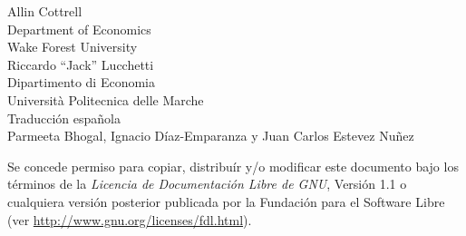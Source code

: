\documentclass[oneside,spanish]{book}
\begin{document}
\VerbatimFootnotes

\setlength{\parindent}{0pt}
\setlength{\parskip}{1ex}



\thispagestyle{empty}

\begin{center}



{\large \sffamily
Allin Cottrell\\
Department of Economics\\
Wake Forest University\\

\vspace{20pt}
Riccardo ``Jack'' Lucchetti\\
Dipartimento di Economia\\
Università Politecnica delle Marche\\

\vspace{20pt}
Traducción española \\
Parmeeta Bhogal, Ignacio Díaz-Emparanza y Juan Carlos Estevez Nuñez

\vspace{20pt}

}

\end{center}
\clearpage


\thispagestyle{empty}


\vspace*{2in}

Se concede permiso para copiar, distribuír y/o modificar este documento bajo
los términos de la \emph{Licencia de Documentación Libre de GNU}, Versión 1.1
o cualquiera versión posterior publicada por la Fundación para el Software Libre
(ver \url{http://www.gnu.org/licenses/fdl.html}).

\clearpage


\pagestyle{headings}

\tableofcontents

\clearpage








\clearpage

\end{document}
